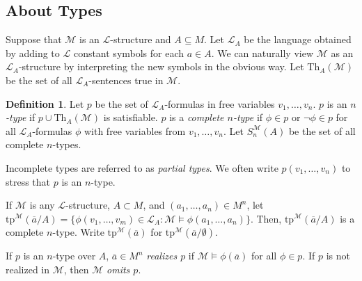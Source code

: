 \documentclass{amsart}
\newtheorem{theorem}{Theorem}[subsection]
\theoremstyle{definition}
\newtheorem{definition}[theorem]{Definition}
\numberwithin{equation}{section}
\begin{document}



\subsection{About Types}
Suppose that $\mathcal{M}$ is an $\mathcal{L}$-structure and $A \subseteq M$.
Let $\mathcal{L}_A$ be the language obtained by adding to $\mathcal{L}$ constant symbols for each $a\in A$.
We can naturally view $\mathcal{M}$ as an $\mathcal{L}_A$-structure by interpreting the new symbols in the obvious way.
Let $\mathrm{Th}_A(\mathcal{M})$ be the set of all $\mathcal{L}_A$-sentences true in $\mathcal{M}$.

\begin{definition}
  Let $p$ be the set of $\mathcal{L}_A$-formulas in free variables $v_1,\dots,v_n$.
  $p$ is an \emph{$n$-type} if $p\cup \mathrm{Th}_A(\mathcal{M})$ is satisfiable.
  $p$ is a \emph{complete $n$-type} if $\phi\in p$ or $\neg\phi\in p$ for all $\mathcal{L}_A$-formulas $\phi$ with free variables from $v_1,\dots,v_n$.
  Let $S^{\mathcal{M}}_n(A)$ be the set of all complete $n$-types.

  Incomplete types are referred to as \emph{partial types}.
  We often write $p(v_1,\dots,v_n)$ to stress that $p$ is an $n$-type.

  If $\mathcal{M}$ is any $\mathcal{L}$-structure,
  $A \subset M$, and $(a_1,\dots,a_n)\in M^n$,
  let $\mathrm{tp}^{\mathcal{M}}(\overline{a}/A) = \{\phi(v_1,\dots,v_m)\in \mathcal{L}_A:\mathcal{M}\models \phi(a_1,\dots,a_n)\}$.
  Then, $\mathrm{tp}^{\mathcal{M}}(\overline{a}/A)$ is a complete $n$-type.
  Write $\mathrm{tp}^{\mathcal{M}}(\overline{a})$ for $\mathrm{tp}^{\mathcal{M}}(\overline{a}/\emptyset)$.

  If $p$ is an $n$-type over $A$,
  $\overline{a}\in M^n$ \emph{realizes $p$} if $\mathcal{M} \models \phi(\overline{a})$ for all $\phi\in p$.
  If $p$ is not realized in $\mathcal{M}$,
  then $\mathcal{M}$ \emph{omits $p$}.
\end{definition}
\end{document}
